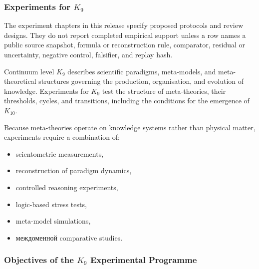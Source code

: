 
\subsubsection{Experiments for \texorpdfstring{$K_9$}{K_9}}

The experiment chapters in this release specify proposed protocols and review designs. They do not report completed empirical support unless a row names a public source snapshot, formula or reconstruction rule, comparator, residual or uncertainty, negative control, falsifier, and replay hash.
\label{sec:experiments-k9}

Continuum level $K_9$ describes scientific paradigms,
meta-models, and meta-theoretical structures governing the
production, organisation, and evolution of knowledge.
Experiments for $K_9$ test the structure of meta-theories,
their thresholds, cycles, and transitions, including the
conditions for the emergence of $K_{10}$.

Because meta-theories operate on knowledge systems rather than
physical matter, experiments require a combination of:

\begin{itemize}
    \item scientometric measurements,
    \item reconstruction of paradigm dynamics,
    \item controlled reasoning experiments,
    \item logic-based stress tests,
    \item meta-model simulations,
    \item междоменной comparative studies.
\end{itemize}



\subsubsection{Objectives of the \texorpdfstring{$K_9$}{K_9} Experimental Programme}

